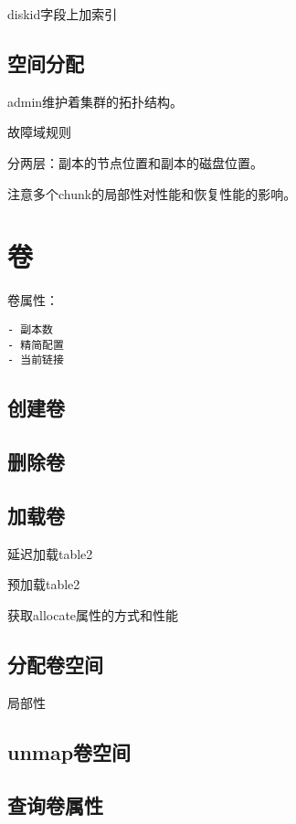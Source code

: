 diskid字段上加索引

\subsection{空间分配}

admin维护着集群的拓扑结构。

故障域规则

分两层：副本的节点位置和副本的磁盘位置。

注意多个chunk的局部性对性能和恢复性能的影响。

\section{卷}

卷属性：
\begin{lstlisting}
- 副本数
- 精简配置
- 当前链接
\end{lstlisting}

\subsection{创建卷}

\subsection{删除卷}

\subsection{加载卷}

\begin{compactenum}
\item 延迟加载table2
\item 预加载table2
\item 获取allocate属性的方式和性能
\end{compactenum}

\subsection{分配卷空间}

局部性

\subsection{unmap卷空间}

\subsection{查询卷属性}

